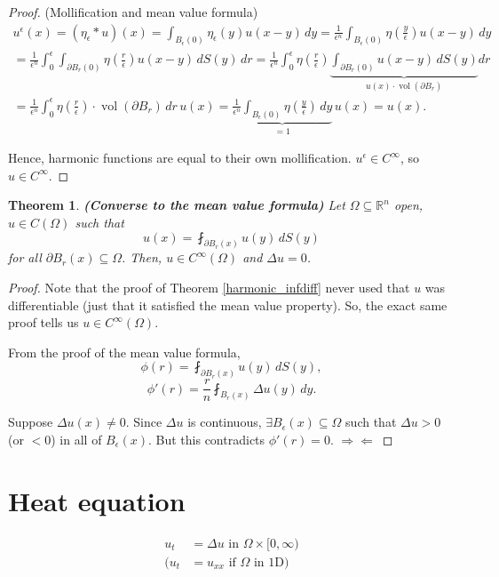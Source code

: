 \documentclass[12pt]{article}
\DeclareMathOperator{\vol}{vol}
\newtheorem{theorem}{Theorem}[section]
\theoremstyle{definition}
\begin{document}
\begin{proof}
(Mollification and mean value formula)
\begin{multline*}
u^\epsilon(x)=(\eta_\epsilon*u)(x)=\int_{B_\epsilon(0)}\eta_\epsilon(y)u(x-y)\,dy=\frac1{\epsilon^n}\int_{B_\epsilon(0)}\eta\left(\frac y\epsilon\right)u(x-y)\,dy\\
=\frac1{\epsilon^n}\int_0^\epsilon\int_{\partial B_r(0)}\eta\left(\frac r\epsilon\right)u(x-y)\,dS(y)\,dr=\frac1{\epsilon^n}\int_0^\epsilon\eta\left(\frac r\epsilon\right)\underbrace{\int_{\partial B_r(0)}u(x-y)\,dS(y)}_{u(x)\cdot\vol(\partial B_r)}dr\\
=\frac1{\epsilon^n}\int_0^\epsilon\eta\left(\frac r\epsilon\right)\cdot\vol(\partial B_r)\,dr\,u(x)=\underbrace{\frac1{\epsilon^n}\int_{B_\epsilon(0)}\eta\left(\frac y\epsilon\right)\,dy}_{=1}\,u(x)=u(x).
\end{multline*}

Hence, harmonic functions are equal to their own mollification. $u^\epsilon\in C^\infty$, so $u\in C^\infty$.
\end{proof}

\begin{theorem}
\emph{\textbf{(Converse to the mean value formula)}} Let $\Omega\subseteq\mathbb R^n$ open, $u\in C(\Omega)$ such that
\[u(x)=\fint_{\partial B_r(x)}u(y)\,dS(y)\]
for all $\partial B_r(x)\subseteq\Omega$. Then, $u\in C^\infty(\Omega)$ and $\Delta u=0$.
\end{theorem}

\begin{proof}
Note that the proof of Theorem \ref{harmonic_infdiff} never used that $u$ was differentiable (just that it satisfied the mean value property). So, the exact same proof tells us $u\in C^\infty(\Omega)$.

From the proof of the mean value formula,
\[\phi(r)=\fint_{\partial B_r(x)}u(y)\,dS(y),\]
\[\phi'(r)=\frac rn\fint_{B_r(x)}\Delta u(y)\,dy.\]

Suppose $\Delta u(x)\neq0$. Since $\Delta u$ is continuous, $\exists B_\epsilon(x)\subseteq\Omega$ such that $\Delta u>0$ (or $<0$) in all of $B_\epsilon(x)$. But this contradicts $\phi'(r)=0$. $\Rightarrow\Leftarrow$
\end{proof}

\section{Heat equation}\label{heat_equation}
\begin{align*}
u_t&=\Delta u\text{ in }\Omega\times[0,\infty)\\
(u_t&=u_{xx}\text{ if }\Omega\text{ in 1D})
\end{align*}
\end{document}

